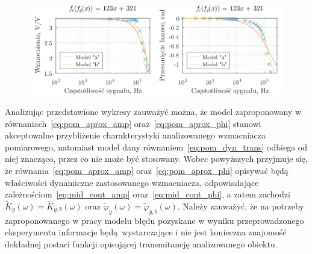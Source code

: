 \begin{figure}[htb!]
\begin{center}
\includegraphics{obrazki/dynamic_ampout}
\end{center}
\end{figure}

Analizując przedstawione wykresy zauważyć można, że model zaproponowany w równaniach~\eqref{eq:pom_aprox_amp} oraz~\eqref{eq:pom_aprox_phi} stanowi akceptowalne przybliżenie charakterystyki analizowanego wzmacniacza pomiarowego, natomiast model dany równaniem~\eqref{eq:pom_dyn_trans} odbiega od niej znacząco, przez co nie może być stosowany. Wobec powyższych przyjmuje się, że równania~\eqref{eq:pom_aprox_amp} oraz~\eqref{eq:pom_aprox_phi} opisywać będą właściwości dynamiczne zastosowanego wzmacniacza, odpowiadające zależnościom~\eqref{eq:mid_cont_amp} oraz~\eqref{eq:mid_cont_phi}, a zatem zachodzi $\tilde{K}_{y}(\omega) = \tilde{K}_{y,b}(\omega)$ oraz $\tilde{\varphi}_{y}(\omega) = \tilde{\varphi}_{y,b}(\omega)$. Należy zauważyć, że na potrzeby zaproponowanego w pracy modelu błędu pozyskane w wyniku przeprowadzonego eksperymentu informacje będą wystarczające i nie jest konieczna znajomość dokładnej postaci funkcji opisującej transmitancję analizowanego obiektu.


